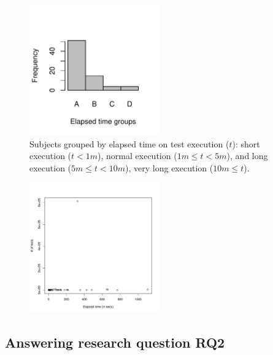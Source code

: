 \begin{figure}[t!]
    \centering
    \includegraphics[width=0.5\textwidth]{plots/timecost-barplot/timecost-barplot.pdf}
    \caption{\label{fig:timecost-barplot} Subjects grouped by elapsed
    time on test execution ($t$): short execution ($t < 1m$), normal
    execution ($1m \leq t < 5m$), and long execution ($5m \leq t <
    10m$), very long execution ($10m \leq t$).}
\end{figure}


\begin{figure}[t!]
    \centering
    \includegraphics[width=0.5\textwidth]{plots/teststime-scatter/timetests-scatter.pdf}
    \caption{\label{fig:timetests-scatter} }
\end{figure}

\subsection{Answering research question RQ2}
\label{sec:rqtwo}


